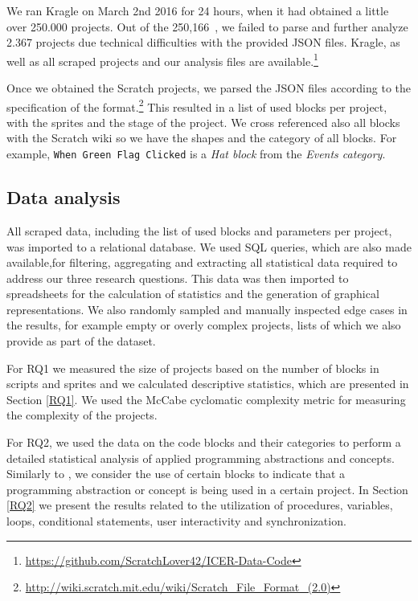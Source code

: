 \documentclass{sig-alternate}
\newcommand{\nPrograms}{250,166}
\begin{document}

We ran Kragle on March 2nd 2016 for 24 hours, when it had obtained a little over 250.000 projects. Out of the \nPrograms~, we failed to parse and further analyze 2.367 projects due technical difficulties with the provided JSON files. Kragle, as well as all scraped projects and our analysis files are available.\footnote{\label{repo}\url{https://github.com/ScratchLover42/ICER-Data-Code}}

Once we obtained the Scratch projects, we parsed the JSON files according to the specification of the format.\footnote{\url{http://wiki.scratch.mit.edu/wiki/Scratch_File_Format_(2.0)}} This resulted in a list of used blocks per project, with the sprites and the stage of the project. We cross referenced also all blocks with the Scratch wiki so we have the shapes and the category of all blocks. For example, \texttt{When Green Flag Clicked} is a \emph{Hat block} from the \emph{Events category}.

\subsection{Data analysis}
\label{dataAnalysis}
All scraped data, including the list of used blocks and parameters per project, was imported to a relational database. We used SQL queries, which are also made available,\footnotemark[\ref{repo}] for filtering, aggregating and extracting all statistical data required to address our three research questions. This data was then imported to spreadsheets for the calculation of statistics and the generation of graphical representations. We also randomly sampled and manually inspected edge cases in the results, for example empty or overly complex projects, lists of which we also provide as part of the dataset.\footnotemark[\ref{repo}]

For RQ1 we measured the size of projects based on the number of blocks in scripts and sprites and we calculated descriptive statistics, which are presented in Section \ref{RQ1}. We used the McCabe cyclomatic complexity metric\cite{mcCabe76} for measuring the complexity of the projects.

For RQ2, we used the data on the code blocks and their categories to perform a detailed statistical analysis of applied programming abstractions and concepts. Similarly to \cite{Maloney_2008}, we consider the use of certain blocks to indicate that a programming abstraction or concept is being used in a certain project. In Section \ref{RQ2} we present the results related to the utilization of procedures, variables, loops, conditional statements, user interactivity and synchronization.
\end{document}
